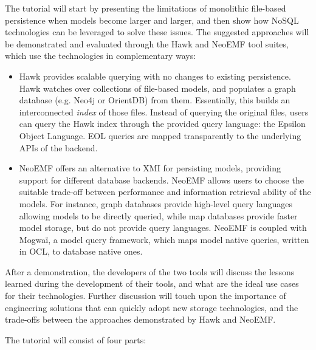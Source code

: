 \documentclass[conference]{IEEEtran}
\begin{document}
The tutorial will start by presenting the limitations of monolithic file-based persistence when models become larger and larger, and then show how NoSQL technologies can be leveraged to solve these issues. The suggested approaches will be demonstrated and evaluated through the Hawk and NeoEMF tool suites, which use the technologies in complementary ways:
\begin{itemize}
\item Hawk provides scalable querying with no changes to existing persistence. Hawk watches over collections of file-based models, and populates a graph database (e.g. Neo4j or OrientDB) from them. Essentially, this builds an interconnected \emph{index} of those files. Instead of querying the original files, users can query the Hawk index through the provided query language: the Epsilon Object Language. EOL queries are mapped transparently to the underlying APIs of the backend.

\item NeoEMF offers an alternative to XMI for persisting models, providing support for different database backends.
NeoEMF allows users to choose the suitable trade-off between performance and information retrieval ability of the models.
For instance, graph databases  provide high-level query languages allowing models to be directly queried, while map databases provide faster model storage, but do not provide query languages.
NeoEMF is coupled with Mogwa\"i, a model query framework, which maps model native queries, written in OCL, to database native ones.

\end{itemize}

After a demonstration, the developers of the two tools will discuss the lessons learned during the development of their tools, and what are the ideal use cases for their technologies. Further discussion will touch upon the importance of engineering solutions that can quickly adopt new storage technologies, and the trade-offs between the approaches demonstrated by Hawk and NeoEMF.

The tutorial will consist of four parts:
\end{document}
